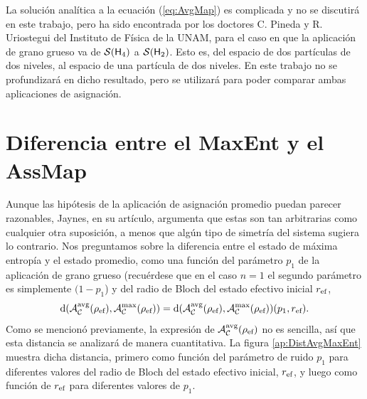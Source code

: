 La solución analítica a la ecuación (\ref{eq:AvgMap}) es complicada y no se discutirá en este trabajo, pero ha sido encontrada por los doctores C. Pineda y R. Uriostegui del Instituto de Física de la UNAM, para el caso en que la aplicación de grano grueso va de $\mathcal{S}({\sf H}_{4})$ a $\mathcal{S}({\sf H}_{2})$. Esto es, del espacio de dos partículas de dos niveles, al espacio de una partícula de dos niveles. En este trabajo no se profundizará en dicho resultado, pero se utilizará para poder comparar ambas aplicaciones de asignación.

\section{Diferencia entre el MaxEnt y el AssMap}

Aunque las hipótesis de la aplicación de asignación promedio puedan parecer razonables, Jaynes, en su artículo, argumenta que estas son tan arbitrarias como cualquier otra suposición, a menos que algún tipo de simetría del sistema sugiera lo contrario. Nos preguntamos sobre la diferencia entre el estado de máxima entropía y el estado promedio, como una función del parámetro $p_{1}$ de la aplicación de grano grueso (recuérdese que en el caso $n=1$ el segundo parámetro es simplemente $(1-p_{1}$) y del radio de Bloch del estado efectivo inicial $r_{\text{ef}}$, \ie{} 
\begin{equation}\label{eq:DistAvgMaxEnt}
    \text{d}\qty(\mathcal{A}_{\mathcal{C}}^{\text{avg}}(\rho_{\text{ef}}),\mathcal{A}_{\mathcal{C}}^{\max}(\rho_{\text{ef}}))=\text{d}\qty(\mathcal{A}_{\mathcal{C}}^{\text{avg}}(\rho_{\text{ef}}),\mathcal{A}_{\mathcal{C}}^{\max}(\rho_{\text{ef}}))(p_{1},r_{\text{ef}}).\nonumber
\end{equation}
Como se mencionó previamente, la expresión de $\mathcal{A}_{\mathcal{C}}^{\text{avg}}(\rho_{\text{ef}})$ no es sencilla, así que esta distancia se analizará de manera cuantitativa. La figura \ref{ap:DistAvgMaxEnt} muestra dicha distancia, primero como función del parámetro de ruido $p_{1}$ para diferentes valores del radio de Bloch del estado efectivo inicial, $r_{\text{ef}}$, y luego como función de $r_{\text{ef}}$ para diferentes valores de $p_{1}$.
